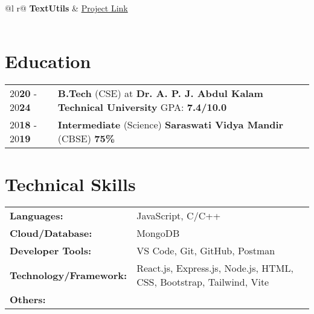 \documentclass[a4paper,12pt]{article}
\begin{document}
\begin{tabularx}{\linewidth}{ @{}l r@{} }
\textbf{TextUtils} & \hfill \href{https://github.com/AshutoshSingh2021/my-First-react-app}{Project Link} \\[2.00pt]
  \\
\end{tabularx}
\section{Education}
\begin{tabularx}{\linewidth}{@{}l X@{}}	
20\textbf{20} - 20\textbf{24} & \textbf{B.Tech} (CSE) at \textbf{Dr. A. P. J. Abdul Kalam Technical University} \hfill \normalsize GPA: \textbf{7.4/10.0} \\
20\textbf{18} - 20\textbf{19} & \textbf{Intermediate} (Science) \textbf{Saraswati Vidya Mandir} (CBSE) \hfill  \textbf{75\%} \\

\end{tabularx}

\section{Technical Skills}
\begin{tabularx}{\linewidth}{@{}l X@{}}
\textbf{Languages: } &  \normalsize{JavaScript, C/C++}\\
\textbf{Cloud/Database: }  &  \normalsize{MongoDB}\\
\textbf{Developer Tools: }  &  \normalsize{VS Code, Git, GitHub, Postman}\\
\textbf{Technology/Framework: }  &  \normalsize{React.js, Express.js, Node.js, HTML, CSS, Bootstrap, Tailwind, Vite}\\
\textbf{Others: }  &  \normalsize{}\\
\end{tabularx}
\end{document}
